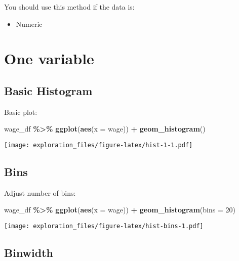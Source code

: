 \documentclass[
]{book}
\newenvironment{Shaded}{\begin{snugshade}}{\end{snugshade}}
\newcommand{\DataTypeTok}[1]{\textcolor[rgb]{0.13,0.29,0.53}{#1}}
\newcommand{\DecValTok}[1]{\textcolor[rgb]{0.00,0.00,0.81}{#1}}
\newcommand{\KeywordTok}[1]{\textcolor[rgb]{0.13,0.29,0.53}{\textbf{#1}}}
\newcommand{\NormalTok}[1]{#1}
\newcommand{\OperatorTok}[1]{\textcolor[rgb]{0.81,0.36,0.00}{\textbf{#1}}}
\newcommand{\StringTok}[1]{\textcolor[rgb]{0.31,0.60,0.02}{#1}}
\providecommand{\tightlist}{%
  \setlength{\itemsep}{0pt}\setlength{\parskip}{0pt}}
\begin{document}
You should use this method if the data is:

\begin{itemize}
\tightlist
\item
  Numeric
\end{itemize}

\hypertarget{one-variable-1}{%
\section{One variable}\label{one-variable-1}}

\hypertarget{basic-histogram}{%
\subsection{Basic Histogram}\label{basic-histogram}}

Basic plot:

\begin{Shaded}
\begin{Highlighting}[]
\NormalTok{wage\_df }\OperatorTok{\%\textgreater{}\%}\StringTok{ }
\StringTok{  }\KeywordTok{ggplot}\NormalTok{(}\KeywordTok{aes}\NormalTok{(}\DataTypeTok{x =}\NormalTok{ wage)) }\OperatorTok{+}
\StringTok{  }\KeywordTok{geom\_histogram}\NormalTok{()}
\end{Highlighting}
\end{Shaded}

\texttt{[image: exploration\_files/figure-latex/hist-1-1.pdf]}

\hypertarget{bins}{%
\subsection{Bins}\label{bins}}

Adjust number of bins:

\begin{Shaded}
\begin{Highlighting}[]
\NormalTok{wage\_df }\OperatorTok{\%\textgreater{}\%}\StringTok{ }
\StringTok{  }\KeywordTok{ggplot}\NormalTok{(}\KeywordTok{aes}\NormalTok{(}\DataTypeTok{x =}\NormalTok{ wage)) }\OperatorTok{+}
\StringTok{  }\KeywordTok{geom\_histogram}\NormalTok{(}\DataTypeTok{bins =} \DecValTok{20}\NormalTok{)}
\end{Highlighting}
\end{Shaded}

\texttt{[image: exploration\_files/figure-latex/hist-bins-1.pdf]}

\hypertarget{binwidth}{%
\subsection{Binwidth}\label{binwidth}}
\end{document}
